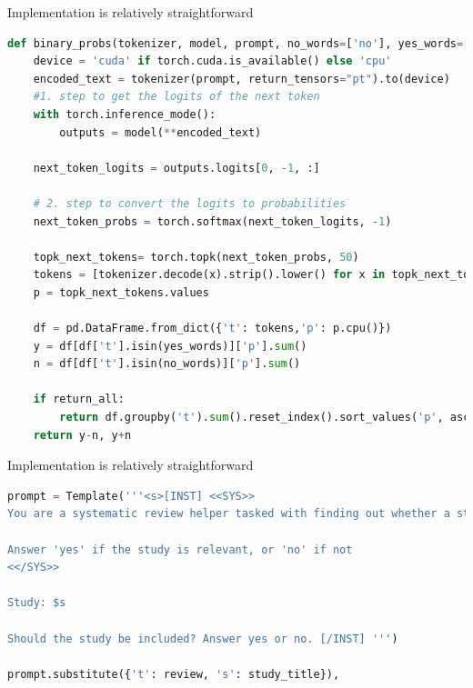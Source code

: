 \documentclass[9pt,aspectratio=169]{beamer}
\begin{document}
\begin{frame}[fragile]{Implementation is relatively straightforward}
\small
\begin{lstlisting}[language=Python]
def binary_probs(tokenizer, model, prompt, no_words=['no'], yes_words=['yes'], return_all=False):
    device = 'cuda' if torch.cuda.is_available() else 'cpu'
    encoded_text = tokenizer(prompt, return_tensors="pt").to(device)
    #1. step to get the logits of the next token
    with torch.inference_mode():
        outputs = model(**encoded_text)

    next_token_logits = outputs.logits[0, -1, :]

    # 2. step to convert the logits to probabilities
    next_token_probs = torch.softmax(next_token_logits, -1)

    topk_next_tokens= torch.topk(next_token_probs, 50)
    tokens = [tokenizer.decode(x).strip().lower() for x in topk_next_tokens.indices]
    p = topk_next_tokens.values

    df = pd.DataFrame.from_dict({'t': tokens,'p': p.cpu()})
    y = df[df['t'].isin(yes_words)]['p'].sum()
    n = df[df['t'].isin(no_words)]['p'].sum()

    if return_all:
        return df.groupby('t').sum().reset_index().sort_values('p', ascending=False).reset_index(drop=True)
    return y-n, y+n
\end{lstlisting}

\end{frame}

\begin{frame}[fragile]{Implementation is relatively straightforward}
	\small
\begin{lstlisting}[language=Python]
prompt = Template('''<s>[INST] <<SYS>>
You are a systematic review helper tasked with finding out whether a study is relevant to the review $t

Answer 'yes' if the study is relevant, or 'no' if not
<</SYS>>

Study: $s 

Should the study be included? Answer yes or no. [/INST] ''')

prompt.substitute({'t': review, 's': study_title}),
\end{lstlisting}
	
\end{frame}

\end{document}
